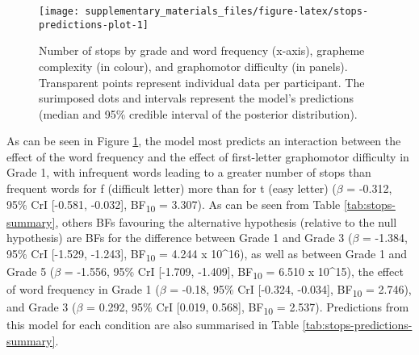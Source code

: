 \documentclass[
  11pt,
  english,
  ,doc,floatsintext]{apa6}
\begin{document}
\begin{figure}[!htb]

{\centering \texttt{[image: supplementary\_materials\_files/figure-latex/stops-predictions-plot-1]} 

}

\caption{Number of stops by grade and word frequency (x-axis), grapheme complexity (in colour), and graphomotor difficulty (in panels). Transparent points represent individual data per participant. The surimposed dots and intervals represent the model's predictions (median and 95\% credible interval of the posterior distribution).}\label{fig:stops-predictions-plot}
\end{figure}

As can be seen in Figure \ref{fig:stops-predictions-plot}, the model most predicts an interaction between the effect of the word frequency and the effect of first-letter graphomotor difficulty in Grade 1, with infrequent words leading to a greater number of stops than frequent words for f (difficult letter) more than for t (easy letter)
(\(\beta\) = -0.312, 95\% CrI {[}-0.581, -0.032{]}, BF\textsubscript{10} = 3.307). As can be seen from Table \ref{tab:stops-summary}, others BFs favouring the alternative hypothesis (relative to the null hypothesis) are BFs for the difference between Grade 1 and Grade 3 (\(\beta\) = -1.384, 95\% CrI {[}-1.529, -1.243{]}, BF\textsubscript{10} = 4.244 x 10\^{}16), as well as between Grade 1 and Grade 5 (\(\beta\) = -1.556, 95\% CrI {[}-1.709, -1.409{]}, BF\textsubscript{10} = 6.510 x 10\^{}15), the effect of word frequency in Grade 1 (\(\beta\) = -0.18, 95\% CrI {[}-0.324, -0.034{]}, BF\textsubscript{10} = 2.746), and Grade 3 (\(\beta\) = 0.292, 95\% CrI {[}0.019, 0.568{]}, BF\textsubscript{10} = 2.537). Predictions from this model for each condition are also summarised in Table \ref{tab:stops-predictions-summary}.
\end{document}
